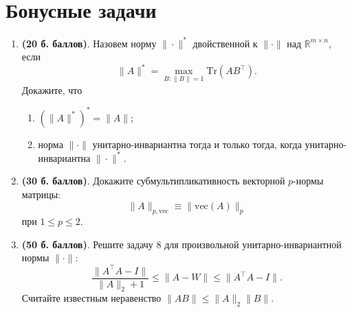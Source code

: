 \documentclass{article}
\begin{document}
\section*{Бонусные задачи}
\begin{enumerate}
    \item \textbf{(20 б. баллов)}. 
    Назовем норму $\|\cdot\|^{*}$ двойственной к $\|\cdot\|$ над $\mathbb{R}^{m\times n}$, если 
    \[
        \|A\|^{*} = \max_{B\colon \|B\|=1} \mathrm{Tr}\left(AB^\top\right).
    \]
    Докажите, что
    \begin{enumerate}
        \item $\left(\|A\|^{*}\right)^* = \|A\|$;
        \item норма $\|\cdot\|$ унитарно-инвариантна тогда и только тогда, когда унитарно-инвариантна $\|\cdot\|^{*}$.
    \end{enumerate}
    \item \textbf{(30 б. баллов)}.
 Докажите субмультипликативность векторной $p$-нормы матрицы:
        \[
            \|A\|_{p,\mathrm{vec}} \equiv \|\mathrm{vec}(A)\|_p
        \]
        при $1\leq p \leq 2$.
     \item \textbf{(50 б. баллов)}.
     Решите задачу 8 для произвольной унитарно-инвариантной нормы $\|\cdot\|$: 
    \[  
        \frac{\|A^\top A - I\|}{\|A\|_2 + 1} \leq \|A - W \| \leq \|A^\top  A - I\|.
    \]
    Считайте известным неравенство $\|AB\|\leq \|A\|_2 \|B\|$.
\end{enumerate}
\end{document}
